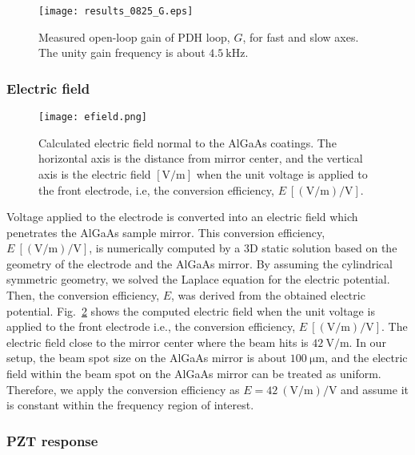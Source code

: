 \documentclass[%
 reprint,
 superscriptaddress,
 amsmath,amssymb,
 aps,
]{revtex4-2}
\newcommand{\unit}[1]{\ \mathrm{#1}}
\begin{document}
\begin{figure}[htbp]
\texttt{[image: results\_0825\_G.eps]}
\caption{
Measured open-loop gain of PDH loop, $G$, for fast and slow axes. The unity gain frequency is about $4.5\unit{kHz}$.
}
\label{fig.rawOLG}
\end{figure}

\subsubsection{Electric field}

\begin{figure}[htbp]
\texttt{[image: efield.png]}
\caption{
Calculated electric field normal to the AlGaAs coatings.
The horizontal axis is the distance from mirror center, and the vertical axis is the electric field $\mathrm{[V/m]}$ when the unit voltage is applied to the front electrode, i.e, the conversion efficiency, $E\unit{[(V/m)/V]}$.
}
\label{fig.efield}
\end{figure}

Voltage applied to the electrode is converted into an electric field which penetrates the AlGaAs sample mirror.
This conversion efficiency, $E\unit{[(V/m)/V]}$, is numerically computed by a 3D static solution based on the geometry of the electrode and the AlGaAs mirror.
By assuming the cylindrical symmetric geometry, we solved the Laplace equation for the electric potential.
Then, the conversion efficiency, $E$, was derived from the obtained electric potential.
Fig.~\ref{fig.efield} shows the computed electric field when the unit voltage is applied to the front electrode i.e., the conversion efficiency, $E\unit{[(V/m)/V]}$.
The electric field close to the mirror center where the beam hits is $42\unit{V/m}$.
In our setup, the beam spot size on the AlGaAs mirror is about $100\unit{\mu m}$, and the electric field within the beam spot on the AlGaAs mirror can be treated as uniform.
Therefore, we apply the conversion efficiency as $E = 42\unit{(V/m)/V}$ and assume it is constant within the frequency region of interest.

\subsubsection{PZT response}
\end{document}
